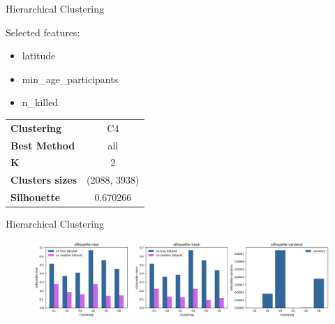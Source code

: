 
\begin{frame}{Hierarchical Clustering}

    \begin{exampleblock}{Selected features:}
        \begin{itemize}
            \item latitude
            \item min\_age\_participants
            \item n\_killed
        \end{itemize}
    \end{exampleblock}

    
    
    \begin{table}[]
        \centering
        \begin{tabular}{|lc|}
            \hline  
            \textbf{Clustering}  & C4 \\
              \textbf{Best Method} & all\\
              \textbf{K} & 2\\
              \textbf{Clusters sizes} & (2088, 3938) \\
              \textbf{Silhouette} & 0.670266 \\
              \hline
        \end{tabular}
        \label{tab:my_label}
    \end{table}
\end{frame}


\begin{frame}{Hierarchical Clustering}
    \begin{figure}
    \centering
    \includegraphics[width=.99\textwidth]{img/clustering/hier.png}
    \label{hier}
\end{figure}
\end{frame}


